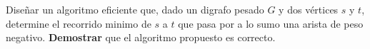 
  \item Diseñar un algoritmo eficiente que, dado un digrafo pesado $G$ y dos vértices $s$ y $t$, determine el recorrido minimo de $s$ a $t$ que pasa por a lo sumo una arista de peso negativo.  \textbf{Demostrar} que el algoritmo propuesto es correcto.


